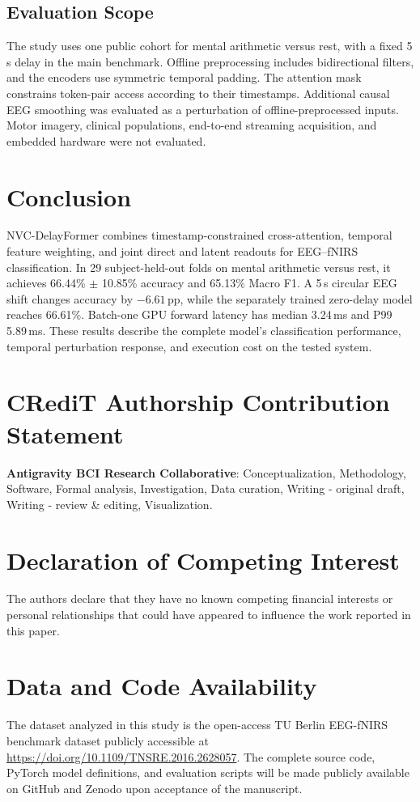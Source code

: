 \documentclass[final,5p,times,twocolumn]{elsarticle}
\begin{document}
\subsection{Evaluation Scope}
The study uses one public cohort for mental arithmetic versus rest, with a fixed 5\,s delay in the main benchmark. Offline preprocessing includes bidirectional filters, and the encoders use symmetric temporal padding. The attention mask constrains token-pair access according to their timestamps. Additional causal EEG smoothing was evaluated as a perturbation of offline-preprocessed inputs. Motor imagery, clinical populations, end-to-end streaming acquisition, and embedded hardware were not evaluated.

\section{Conclusion}
NVC-DelayFormer combines timestamp-constrained cross-attention, temporal feature weighting, and joint direct and latent readouts for EEG--fNIRS classification. In 29 subject-held-out folds on mental arithmetic versus rest, it achieves 66.44\% $\pm$ 10.85\% accuracy and 65.13\% Macro F1. A 5\,s circular EEG shift changes accuracy by $-6.61$\,pp, while the separately trained zero-delay model reaches 66.61\%. Batch-one GPU forward latency has median 3.24\,ms and P99 5.89\,ms. These results describe the complete model's classification performance, temporal perturbation response, and execution cost on the tested system.

\section*{CRediT Authorship Contribution Statement}
\textbf{Antigravity BCI Research Collaborative}: Conceptualization, Methodology, Software, Formal analysis, Investigation, Data curation, Writing - original draft, Writing - review \& editing, Visualization.

\section*{Declaration of Competing Interest}
The authors declare that they have no known competing financial interests or personal relationships that could have appeared to influence the work reported in this paper.

\section*{Data and Code Availability}
The dataset analyzed in this study is the open-access TU Berlin EEG-fNIRS benchmark dataset publicly accessible at \url{https://doi.org/10.1109/TNSRE.2016.2628057}. The complete source code, PyTorch model definitions, and evaluation scripts will be made publicly available on GitHub and Zenodo upon acceptance of the manuscript.
\end{document}
